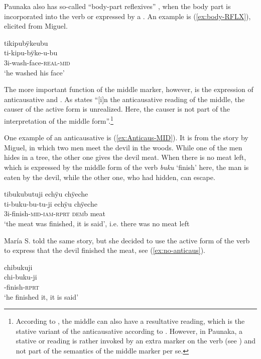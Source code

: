 Paunaka also has so-called “body-part reflexives” \citep[77]{Kemmer1993}, when the body part is incorporated into the verb or expressed by a . An example is (\ref{ex:body-RFLX}), elicited from Miguel.

\ea\label{ex:body-RFLX}
\begingl 
\glpreamble tikipubÿkeubu\\
\gla ti-kipu-bÿke-u-bu\\ 
\glb 3i-wash-face-\textsc{real}-\textsc{mid}\\ 
\glft ‘he washed his face’
 \trailingcitation{[mdx-c120416ls.079]}
\xe
{}

The more important function of the middle marker, however, is the expression of anticausative and . As \citet[1682]{Kaufmann2007} states “[i]n the anticausative reading of the middle, the causer of the active form is unrealized. Here, the causer is not part of the interpretation of the middle form”.\footnote{According to \citet[1683]{Kaufmann2007}, the middle can also have a resultative reading, which is the stative variant of the anticausative according to \citet[1133]{HaspelmathMueller2004}. However, in Paunaka, a stative or  reading is rather invoked by an extra  marker on the verb (see ) and not part of the semantics of the middle marker per se.}

One example of an anticausative is (\ref{ex:Anticaus-MID}). It is from the story by Miguel, in which two men meet the devil in the woods. While one of the men hides in a tree, the other one gives the devil meat. When there is no meat left, which is expressed by the middle form of the verb \textit{buku} ‘finish’ here, the man is eaten by the devil, while the other one, who had hidden, can escape.

\ea\label{ex:Anticaus-MID}
\begingl 
\glpreamble tibukubutuji echÿu chÿeche\\
\gla ti-buku-bu-tu-ji echÿu chÿeche\\ 
\glb 3i-finish-\textsc{mid}-\textsc{iam}-\textsc{rprt} \textsc{dem}b meat\\ 
\glft ‘the meat was finished, it is said’, i.e. there was no meat left
 \trailingcitation{[mxx-n101017s-1.044]}
\xe

María S. told the same story, but she decided to use the active form of the verb to express that the devil finished the meat, see (\ref{ex:no-anticaus}).

\ea\label{ex:no-anticaus}
\begingl 
\glpreamble chibukuji\\
\gla chi-buku-ji\\ 
-finish-\textsc{rprt}\\ 
\glft ‘he finished it, it is said’
 \trailingcitation{[rxx-n120511l-2.41]}
\xe

